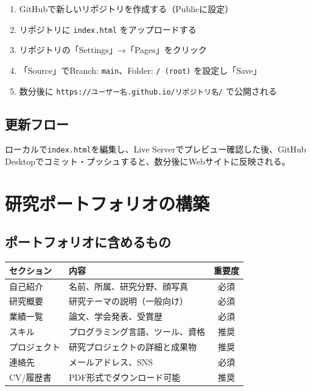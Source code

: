 \begin{enumerate}
\item GitHubで新しいリポジトリを作成する（Publicに設定）
\item リポジトリに \texttt{index.html} をアップロードする
\item リポジトリの「Settings」→「Pages」をクリック
\item 「Source」でBranch: \texttt{main}、Folder: \texttt{/ (root)} を設定し「Save」
\item 数分後に \texttt{https://ユーザー名.github.io/リポジトリ名/} で公開される
\end{enumerate}

\subsection{更新フロー}

ローカルで\texttt{index.html}を編集し、Live Serverでプレビュー確認した後、GitHub Desktopでコミット・プッシュすると、数分後にWebサイトに反映される。

\section{研究ポートフォリオの構築}

\subsection{ポートフォリオに含めるもの}

\begin{table}[H]
\centering
\begin{tabular}{llc}
\toprule
セクション & 内容 & 重要度 \\
\midrule
自己紹介 & 名前、所属、研究分野、顔写真 & 必須 \\
研究概要 & 研究テーマの説明（一般向け） & 必須 \\
業績一覧 & 論文、学会発表、受賞歴 & 必須 \\
スキル & プログラミング言語、ツール、資格 & 推奨 \\
プロジェクト & 研究プロジェクトの詳細と成果物 & 推奨 \\
連絡先 & メールアドレス、SNS & 必須 \\
CV/履歴書 & PDF形式でダウンロード可能 & 推奨 \\
\bottomrule
\end{tabular}
\end{table}

